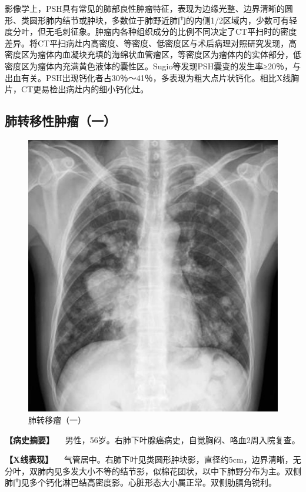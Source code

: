 影像学上，PSH具有常见的肺部良性肿瘤特征，表现为边缘光整、边界清晰的圆形、类圆形肺内结节或肿块，多数位于肺野近肺门的内侧1/2区域内，少数可有轻度分叶，但无毛刺征象。肿瘤内各种组织成分的比例不同决定了CT平扫时的密度差异。将CT平扫病灶内高密度、等密度、低密度区与术后病理对照研究发现，高密度区为瘤体内血凝块充填的海绵状血管瘤区，等密度区为瘤体内的实体部分，低密度区为瘤体内充满黄色液体的囊性区。Sugio等发现PSH囊变的发生率≥20％，与出血有关。PSH出现钙化者占30％～41％，多表现为粗大点片状钙化。相比X线胸片，CT更易检出病灶内的细小钙化灶。

\subsection{肺转移性肿瘤（一）}

\begin{figure}[!htbp]
 \centering
 \includegraphics{./images/Image00175.jpg}
 \captionsetup{justification=centering}
 \caption{肺转移瘤（一）}
 \label{fig3-8-13}
  \end{figure} 

\textbf{【病史摘要】}
　男性，56岁。右肺下叶腺癌病史，自觉胸闷、咯血2周入院复查。

\textbf{【X线表现】}
　气管居中。右肺下叶见类圆形肿块影，直径约5cm，边界清晰，无分叶，双肺内见多发大小不等的结节影，似棉花团状，以中下肺野分布为主。双侧肺门见多个钙化淋巴结高密度影。心脏形态大小属正常。双侧肋膈角锐利。

